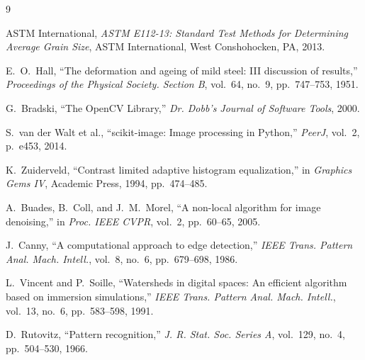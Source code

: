 \documentclass[12pt,a4paper]{article}
\begin{document}
\newpage
\begin{thebibliography}{9}

ASTM International,
\textit{ASTM E112-13: Standard Test Methods for Determining Average Grain Size},
ASTM International, West Conshohocken, PA, 2013.

E.~O.~Hall,
``The deformation and ageing of mild steel: III discussion of results,''
\textit{Proceedings of the Physical Society. Section B},
vol.~64, no.~9, pp.~747--753, 1951.

G.~Bradski,
``The OpenCV Library,''
\textit{Dr. Dobb's Journal of Software Tools}, 2000.

S.~van der Walt et al.,
``scikit-image: Image processing in Python,''
\textit{PeerJ}, vol.~2, p.~e453, 2014.

K.~Zuiderveld,
``Contrast limited adaptive histogram equalization,''
in \textit{Graphics Gems IV}, Academic Press, 1994, pp.~474--485.

A.~Buades, B.~Coll, and J.~M.~Morel,
``A non-local algorithm for image denoising,''
in \textit{Proc. IEEE CVPR}, vol.~2, pp.~60--65, 2005.

J.~Canny,
``A computational approach to edge detection,''
\textit{IEEE Trans. Pattern Anal. Mach. Intell.},
vol.~8, no.~6, pp.~679--698, 1986.

L.~Vincent and P.~Soille,
``Watersheds in digital spaces: An efficient algorithm based on immersion simulations,''
\textit{IEEE Trans. Pattern Anal. Mach. Intell.},
vol.~13, no.~6, pp.~583--598, 1991.

D.~Rutovitz,
``Pattern recognition,''
\textit{J. R. Stat. Soc. Series A}, vol.~129, no.~4, pp.~504--530, 1966.

\end{thebibliography}
\end{document}
